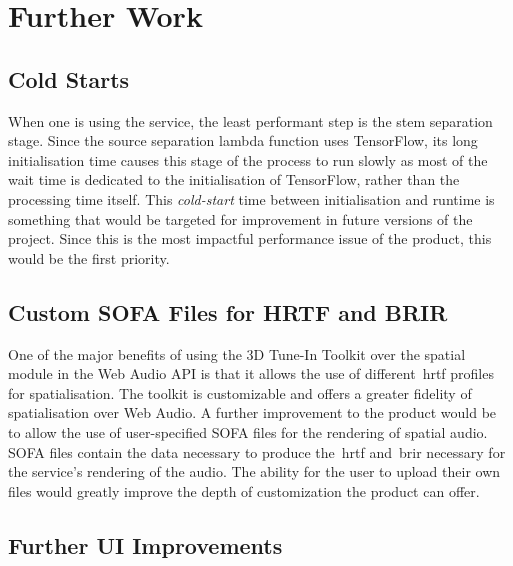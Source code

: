 \thispagestyle{plain}
\newpage
\section{Further Work}\label{sec:further-work}

\normalsize

\subsection{Cold Starts}\label{subsec:cold-starts}

When one is using the service, the least performant step is the stem separation stage.
Since the source separation lambda function uses TensorFlow,
its long initialisation time causes this stage of the process
to run slowly as most of the wait time is dedicated to the initialisation of TensorFlow,
rather than the processing time itself.
This \textit{cold-start}
time between initialisation and runtime is something
that would be targeted for improvement in future versions of the project.
Since this is the most impactful performance issue of the product, this would be the first priority.

\subsection{Custom SOFA Files for HRTF and BRIR}\label{subsec:custom-hrtf-and-hrir-files}

One of the major benefits
of using the 3D Tune-In Toolkit over the spatial module in the Web Audio API is that it allows the use of different~\gls{hrtf} profiles for spatialisation.
The toolkit is customizable and offers a greater fidelity of spatialisation over Web Audio.
A further improvement to the product would be
to allow the use of user-specified SOFA files for the rendering of spatial audio.
SOFA files contain the data necessary to produce the~\gls{hrtf} and~\gls{brir} necessary for the service's rendering of the audio.
The ability
for the user to upload their own files would greatly improve the depth of customization the product can offer.

\subsection{Further UI Improvements}\label{subsec:ui-improvements}

